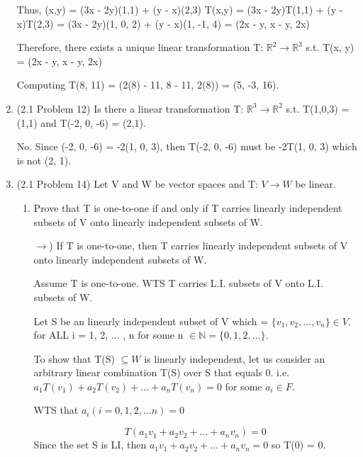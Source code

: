 \documentclass[12pt]{article}
\begin{document}
\begin{enumerate}
    Thus, (x,y) = (3x - 2y)(1,1) + (y - x)(2,3)
    T(x,y) = (3x - 2y)T(1,1) + (y - x)T(2,3) 
    = (3x - 2y)(1, 0, 2) + (y - x)(1, -1, 4) = (2x - y, x - y, 2x) 

    Therefore, there exists a unique linear transformation T: $\mathbb{R}^2 \xrightarrow{} \mathbb{R}^3$ s.t. T(x, y) = (2x - y, x - y, 2x) 

    Computing T(8, 11) = (2(8) - 11, 8 - 11, 2(8)) = (5, -3, 16).

    \qedsymbol{}
    

    \item (2.1 Problem 12) Is there a linear transformation T: $\mathbb{R}^3 \xrightarrow{} \mathbb{R}^2$ s.t. T(1,0,3) = (1,1) and T(-2, 0, -6) = (2,1). 

    No. Since (-2, 0, -6) = -2(1, 0, 3), then T(-2, 0, -6) must be -2T(1, 0, 3) which is not (2, 1). 

    \item (2.1 Problem 14) Let V and W be vector spaces and T: $V \xrightarrow{} W$ be linear. 
        \begin{enumerate}[label=(\alph*)]
            \item Prove that T is one-to-one if and only if T carries linearly independent subsets of V onto linearly independent subsets of W. 

            $\rightarrow$) If T is one-to-one, then T carries linearly independent subsets of V onto linearly independent subsets of W.

            Assume T is one-to-one. WTS T carries L.I. subsets of V onto L.I. subsets of W. 
    
            Let S be an linearly independent subset of V which = $\{v_1, v_2,..., v_n\} \in V$. for ALL i = 1, 2, ... , n for some n $\in \mathbb{N} = \{ 0, 1, 2, ...\}$. 

            To show that T(S) $\subseteq W$ is linearly independent, let us consider an arbitrary linear combination T(S) over S that equals 0. i.e. $a_1T(v_1) + a_2T(v_2) + ... + a_nT(v_n) = 0$ for some $a_i \in F$.

            WTS that $a_i (i = 0, 1, 2, ... n) = 0$
            
            
            \begin{equation}
                T(a_1v_1 + a_2v_2 + ... + a_nv_n) = 0
            \end{equation}
            Since the set S is LI, then $a_1v_1 + a_2v_2 + ... + a_nv_n = 0$ so T(0) = 0. 
            

\end{enumerate}
\end{enumerate}
\end{document}
